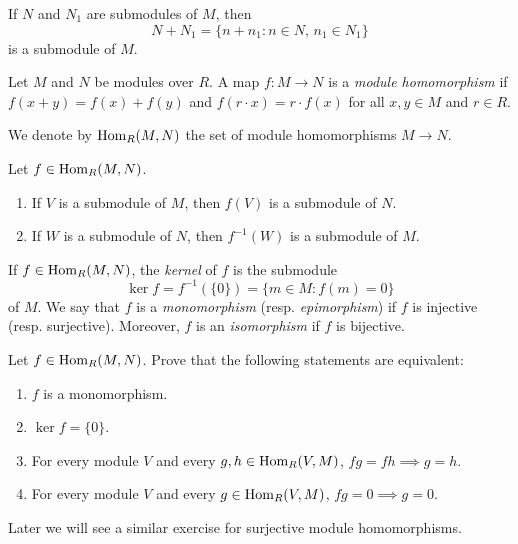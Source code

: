 \begin{exercise}
If $N$ and $N_1$ are submodules of $M$, then 
\[
N+N_1=\{n+n_1:n\in N,\,n_1\in N_1\}
\]
is a submodule of $M$.
\end{exercise}

\begin{definition}
Let $M$ and $N$ be modules over $R$. 
A map $f\colon M\to N$ is a \emph{module homomorphism} if $f(x+y)=f(x)+f(y)$ and 
$f(r\cdot x)=r\cdot f(x)$ for all $x,y\in M$ and $r\in R$. 
\end{definition}

We denote by $\operatorname{Hom}_R(M,N)$ the set of module homomorphisms $M\to N$. 

\begin{exercise}
Let $f\in\operatorname{Hom}_R(M,N)$.  
\begin{enumerate}
\item If $V$ is a submodule of $M$, then $f(V)$ is a submodule of $N$.
\item If $W$ is a submodule of $N$, then $f^{-1}(W)$ is a submodule of $M$.
\end{enumerate}
\end{exercise}

If $f\in\operatorname{Hom}_R(M,N)$, the \emph{kernel} of $f$ is the submodule  
\[
\ker f=f^{-1}(\{0\})=\{m\in M:f(m)=0\}
\]
of $M$. We say that $f$ is a \emph{monomorphism} (resp. \emph{epimorphism}) 
if $f$ is injective (resp. surjective). Moreover, $f$ is an \emph{isomorphism} 
if $f$ is
bijective. 

\begin{exercise}
Let $f\in\operatorname{Hom}_R(M,N)$. Prove that the following statements are equivalent:
\begin{enumerate}
\item $f$ is a monomorphism.
\item $\ker f=\{0\}$.
\item For every module $V$ and every $g,h\in\operatorname{Hom}_R(V,M)$, $fg=fh\implies g=h$.
\item For every module $V$ and every $g\in\operatorname{Hom}_R(V,M)$, $fg=0\implies g=0$.
\end{enumerate}
\end{exercise}

Later we will see a similar exercise for surjective module homomorphisms.

